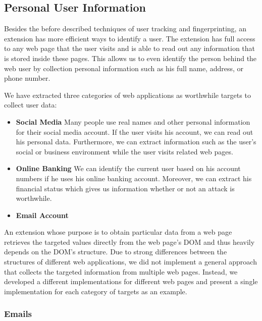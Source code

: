 \subsection{Personal User Information}
	
	Besides the before described techniques of user tracking and fingerprinting, an extension has more efficient ways to identify a user. The extension has full access to any web page that the user visits and is able to read out any information that is stored inside these pages. This allows us to even identify the person behind the web user by collection personal information such as his full name, address, or phone number. 
	
	We have extracted three categories of web applications as worthwhile targets to collect user data:
	\begin{itemize}
		\item \textbf{Social Media} Many people use real names and other personal information for their social media account. If the user visits his account, we can read out his personal data. Furthermore, we can extract information such as the user's social or business environment while the user visits related web pages.
		\item \textbf{Online Banking} We can identify the current user based on his account numbers if he uses his online banking account. Moreover, we can extract his financial status which gives us information whether or not an attack is worthwhile.
		\item \textbf{Email Account} 
	\end{itemize}
	
	An extension whose purpose is to obtain particular data from a web page retrieves the targeted values directly from the web page's DOM and thus heavily depends on the DOM's structure. Due to strong differences between the structures of different web applications, we did not implement a general approach that collects the targeted information from multiple web pages. Instead, we developed a different implementations for different web pages and present a single implementation for each category of targets as an example.
	
\subsubsection{Emails}
		
